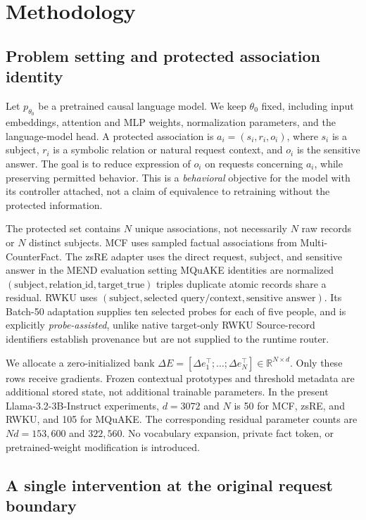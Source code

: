 \documentclass{article}
\newcommand{\R}{\mathbb{R}}
\newcommand{\bank}{\Delta E}
\newcommand{\rowvec}{\Delta e}
\begin{document}
\section{Methodology}
\label{sec:method}

\subsection{Problem setting and protected association identity}
\label{sec:setting}

Let $p_{\theta_0}$ be a pretrained causal language model. We keep $\theta_0$
fixed, including input embeddings, attention and MLP weights, normalization
parameters, and the language-model head. A protected association is
$a_i=(s_i,r_i,o_i)$, where $s_i$ is a subject, $r_i$ is a symbolic relation or
natural request context, and $o_i$ is the sensitive answer. The goal is to
reduce expression of $o_i$ on requests concerning $a_i$, while preserving
permitted behavior. This is a \emph{behavioral} objective for the model with its
controller attached, not a claim of equivalence to retraining without the
protected information.

The protected set contains $N$ unique associations, not necessarily $N$ raw
records or $N$ distinct subjects. MCF uses sampled factual associations from
Multi-CounterFact. The zsRE adapter uses the direct
request, subject, and sensitive answer in the MEND evaluation setting MQuAKE identities are normalized
$(\text{subject},\text{relation\_id},\text{target\_true})$ triples
duplicate atomic records share a residual. RWKU uses
$(\text{subject},\text{selected query/context},\text{sensitive answer})$.
Its Batch-50 adaptation supplies ten selected probes for each of five people,
and is explicitly \emph{probe-assisted}, unlike native target-only RWKU
 Source-record identifiers establish provenance but are
not supplied to the runtime router.

We allocate a zero-initialized bank
$\bank=[\rowvec_1^\top;\ldots;\rowvec_N^\top]\in\R^{N\times d}$.
Only these rows receive gradients. Frozen contextual prototypes and threshold
metadata are additional stored state, not additional trainable parameters.
In the present Llama-3.2-3B-Instruct experiments, $d=3072$ and $N$ is 50 for
MCF, zsRE, and RWKU, and 105 for MQuAKE. The corresponding residual parameter
counts are $Nd=153{,}600$ and $322{,}560$. No vocabulary expansion, private
fact token, or pretrained-weight modification is introduced.

\subsection{A single intervention at the original request boundary}
\label{sec:boundary}
\end{document}
